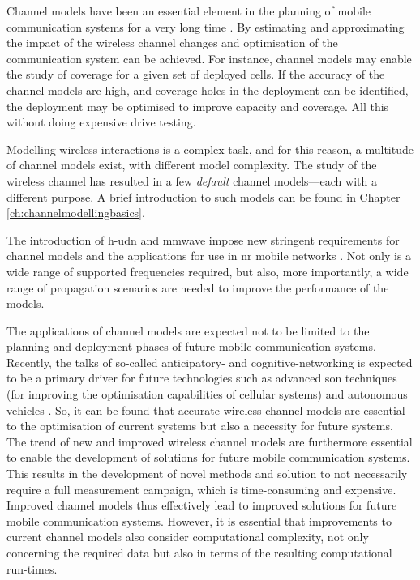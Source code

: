 Channel models have been an essential element in the planning of mobile communication systems for a very long time \cite{Taufique2017, Cavalcanti2017}. By estimating and approximating the impact of the wireless channel changes and optimisation of the communication system can be achieved. For instance, channel models may enable the study of coverage for a given set of deployed cells. If the accuracy of the channel models are high, and coverage holes in the deployment can be identified, the deployment may be optimised to improve capacity and coverage. All this without doing expensive drive testing.

Modelling wireless interactions is a complex task, and for this reason, a multitude of channel models exist, with different model complexity. The study of the wireless channel has resulted in a few \emph{default} channel models—each with a different purpose. A brief introduction to such models can be found in Chapter \ref{ch:channelmodellingbasics}.

The introduction of \gls{h-udn} and \gls{mmwave} impose new stringent requirements for channel models and the applications for use in \gls{nr} mobile networks 
\cite{Wang2018}. Not only is a wide range of supported frequencies required, but also, more importantly, a wide range of propagation scenarios are needed to improve the performance of the models. 

The applications of channel models are expected not to be limited to the planning and deployment phases of future mobile communication systems. Recently, the talks of so-called anticipatory- and cognitive-networking is expected to be a primary driver for future technologies such as advanced \gls{son} techniques (for improving the optimisation capabilities of cellular systems) and autonomous vehicles \cite{Bui2017ATechniques, Zhang2018}. So, it can be found that accurate wireless channel models are essential to the optimisation of current systems but also a necessity for future systems. The trend of new and improved wireless channel models are furthermore essential to enable the development of solutions for future mobile communication systems. This results in the development of novel methods and solution to not necessarily require a full measurement campaign, which is time-consuming and expensive. Improved channel models thus effectively lead to improved solutions for future mobile communication systems. However, it is essential that improvements to current channel models also consider computational complexity, not only concerning the required data but also in terms of the resulting computational run-times.


